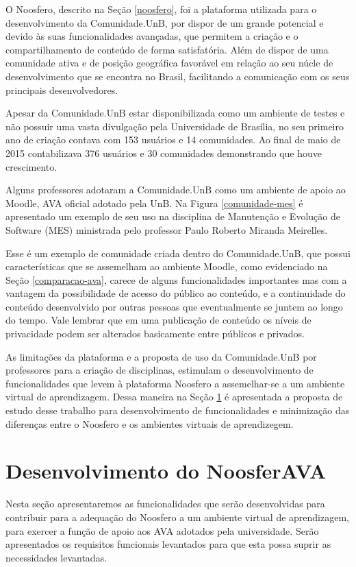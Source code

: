 O Noosfero, descrito na Seção \ref{noosfero}, foi a plataforma utilizada para o desenvolvimento da Comunidade.UnB, por dispor de um grande potencial e devido às suas funcionalidades avançadas, que permitem a criação e o compartilhamento de conteúdo de forma satisfatória. Além de dispor de uma comunidade ativa e de posição geográfica favorável em relação ao seu núcle de desenvolvimento que se encontra no Brasil, facilitando a comunicação com os seus principais desenvolvedores.

Apesar da Comunidade.UnB estar disponibilizada como um ambiente de testes e não possuir uma vasta divulgação pela Universidade de Brasília, no seu primeiro ano de criação contava com 153 usuários e 14 comunidades. Ao final de maio de 2015 contabilizava 376 usuários e 30 comunidades demonstrando que houve crescimento.

Alguns professores adotaram a Comunidade.UnB como um ambiente de apoio ao Moodle, AVA oficial adotado pela UnB. Na Figura \ref{comunidade-mes} é apresentado um exemplo de seu uso na disciplina de Manutenção e Evolução de Software (MES) ministrada pelo professor Paulo Roberto Miranda Meirelles.

Esse é um exemplo de comunidade criada dentro do Comunidade.UnB, que possui características que se assemelham ao ambiente Moodle, como evidenciado na Seção \ref{comparacao-ava}, carece de alguns funcionalidades importantes mas com a vantagem da possibilidade de acesso do público ao conteúdo, e a continuidade do conteúdo desenvolvido por outras pessoas que eventualmente se juntem ao longo do tempo. Vale lembrar que em uma publicação de conteúdo os níveis de privacidade podem ser alterados basicamente entre públicos e privados.

As limitações da plataforma e a proposta de uso da Comunidade.UnB por professores para a criação de disciplinas, estimulam o desenvolvimento de funcionalidades que levem à plataforma Noosfero a assemelhar-se a um ambiente virtual de aprendizagem. Dessa maneira na Seção \ref{desen-noosferAVA} é apresentada a proposta de estudo desse trabalho para desenvolvimento de funcionalidades e minimização das diferenças entre o Noosfero e os ambientes virtuais de aprendizegem.

\section{Desenvolvimento do NoosferAVA}
\label{desen-noosferAVA}

Nesta seção apresentaremos as funcionalidades que serão desenvolvidas para contribuir para a adequação do Noosfero a um ambiente virtual de aprendizagem, para exercer a função de apoio aos AVA adotados pela universidade. Serão apresentados os requisitos funcionais levantados para que esta possa suprir as necessidades levantadas.

